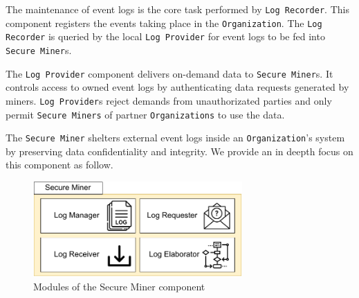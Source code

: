 The maintenance of event logs is the core task performed by \texttt{Log Recorder}. This component registers the events taking place in the \texttt{Organization}. The \texttt{Log Recorder} is queried by the local \texttt{Log Provider} for event logs to be fed into \texttt{Secure Miner}s. 



The \texttt{Log Provider} component delivers on-demand data to \texttt{Secure Miner}s. %
It controls access to owned event logs by authenticating data requests generated by miners. \texttt{Log Provider}s reject demands from unauthorizated parties and only permit \texttt{Secure Miners} of partner \texttt{Organizations} to use the data.    %

The \texttt{Secure Miner} shelters external event logs inside an \texttt{Organization}'s system by preserving data confidentiality and integrity. We provide an in deepth focus on this component as follow.

\begin{figure}[t]
\centering
\includegraphics[width=8cm]{content/figures/secure_miner.pdf}
\caption{Modules of the Secure Miner component}
\label{fig:trusted_miner}
\end{figure}




